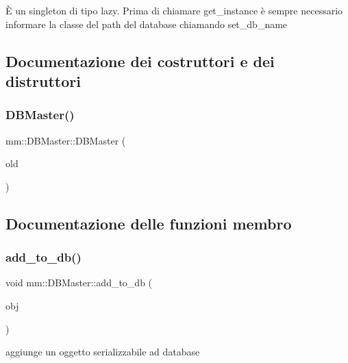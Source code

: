 È un singleton di tipo lazy. Prima di chiamare get\+\_\+instance è sempre necessario informare la classe del path del database chiamando set\+\_\+db\+\_\+name 

\subsection{Documentazione dei costruttori e dei distruttori}
\mbox{\label{classmm_1_1_d_b_master_a7571cbb3fe77a491d57595ec9bc86abf}} 
\subsubsection{\texorpdfstring{D\+B\+Master()}{DBMaster()}}
{\footnotesize\ttfamily mm\+::\+D\+B\+Master\+::\+D\+B\+Master (\begin{DoxyParamCaption}\item[{const \mbox{\hyperlink{classmm_1_1_d_b_master}{D\+B\+Master}} \&}]{old }\end{DoxyParamCaption})\hspace{0.3cm}{\ttfamily [delete]}}



\subsection{Documentazione delle funzioni membro}
\mbox{\label{classmm_1_1_d_b_master_a187988c8741d0a2c5806919b8d672af0}} 
\subsubsection{\texorpdfstring{add\+\_\+to\+\_\+db()}{add\_to\_db()}}
{\footnotesize\ttfamily void mm\+::\+D\+B\+Master\+::add\+\_\+to\+\_\+db (\begin{DoxyParamCaption}\item[{const \mbox{\hyperlink{classmm_1_1_i_serializable}{I\+Serializable}} \&}]{obj }\end{DoxyParamCaption})}



aggiunge un oggetto serializzabile ad database 

